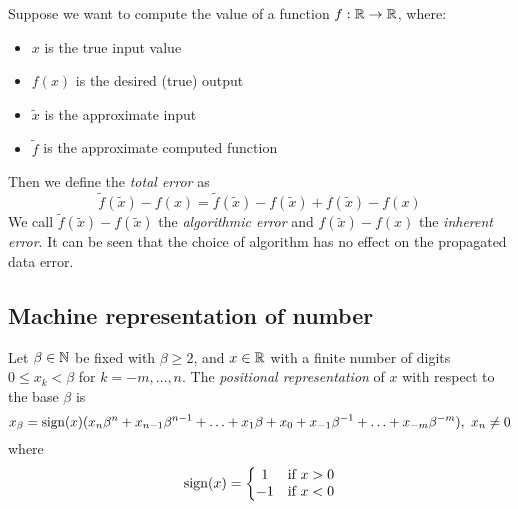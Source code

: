 

Suppose we want to compute the value of a function $f: \mathbb{R} \rightarrow \mathbb{R}$, where:

\begin{itemize}
    \item $x$ is the true input value
    \item $f(x)$ is the desired (true) output
    \item $\tilde{x}$ is the approximate input
    \item $\tilde{f}$ is the approximate computed function
\end{itemize}

Then we define the \textit{total error} as
$$ \tilde{f}(\tilde{x}) - f(x) = \tilde{f}(\tilde{x}) - f(\tilde{x}) + f(\tilde{x}) - f(x) $$
We call $\tilde{f}(\tilde{x}) - f(\tilde{x})$ the \textit{algorithmic error} and $f(\tilde{x}) - f(x)$ the \textit{inherent  error}. It can be seen that the choice of algorithm has no effect on the propagated data error.




\subsection{Machine representation of number}

Let $\beta \in \mathbb{N}$ be fixed with $\beta \geq 2$, and $x \in \mathbb{R}$ with a finite number of digits $0 \leq x_k < \beta$ for $k = -m, \hdots, n$. The \textit{positional representation} of $x$ with respect to the base $\beta$ is
$$ x_{\beta} = \mathrm{sign}(x)(x_{n}\beta^{n} + x_{n-1}\beta^{n-1} + \hdots + x_{1}\beta + x_{0} + x_{-1}\beta^{-1} + \hdots + x_{-m}\beta^{-m}),\ x_n \neq 0 $$
where
$$ \mathrm{sign}(x) = \left\{ \begin{matrix} 1 & \text{if}\ x > 0 \\ -1 & \text{if}\ x < 0 \end{matrix} \right. $$


